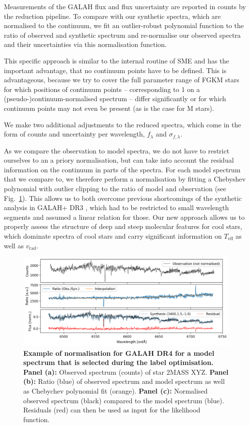 \documentclass[
  journal=pasa,
  manuscript=research-paper, %
  year=2023,
  volume=37
]{cup-journal}
\newcommand{\Teff}{$T_\mathrm{eff}$\xspace}
\newcommand{\vrad}{$v_\mathrm{rad}$\xspace}
\begin{document}
Measurements of the GALAH flux and flux uncertainty are reported in counts by the reduction pipeline. To compare with our synthetic spectra, which are normalised to the continuum, we fit an outlier-robust polynomial function to the ratio of observed and synthetic spectrum and re-normalise our observed spectra and their uncertainties via this normalisation function.

This specific approach is similar to the internal routine of \textsc{SME} \citep{Piskunov2017} and has the important advantage, that no continuum points have to be defined. This is advantageous, because we try to cover the full parameter range of FGKM stars for which positions of continuum points -- corresponding to 1 on a (pseudo-)continuum-normalised spectrum -- differ significantly or for which continuum points may not even be present (as is the case for M stars).

 We make two additional adjustments to the reduced spectra, which come in the form of counts and uncertainty per wavelength, $f_\lambda$ and $\sigma_{f,\lambda}$.

 As we compare the observation to model spectra, we do not have to restrict ourselves to an a priory normalisation, but can take into account the residual information on the continuum in parts of the spectra. For each model spectrum that we compare to, we therefore perform a normalisation by fitting a Chebyshev polynomial with outlier clipping to the ratio of model and observation (see Fig.~\ref{fig:ratio_normalisation}). This allows us to both overcome previous shortcomings of the synthetic analysis in GALAH+ DR3 \citep{Buder2021}, which had to be restricted to small wavelength segments and assumed a linear relation for those. Our new approach allows us to properly assess the structure of deep and steep molecular features for cool stars, which dominate spectra of cool stars and carry significant information on \Teff as well as \vrad.

 \begin{figure}[hbt]
  \centering
  \includegraphics[width=\textwidth]{figures/Nuisance_example.png}
  \caption{
  \textbf{Example of normalisation for GALAH DR4 for a model spectrum that is selected during the label optimisation.}
  \textbf{Panel (a):} Observed spectrum (counts) of star 2MASS XYZ.
  \textbf{Panel (b):} Ratio (blue) of observed spectrum and model spectrum as well as Chebychev polynomial fit (orange).
  \textbf{Panel (c):} Normalised observed spectrum (black) compared to the model spectrum (blue). Residuals (red) can then be used as input for the likelihood function.
  }
  \label{fig:ratio_normalisation}
 \end{figure}
\end{document}
